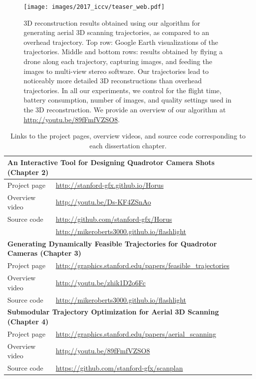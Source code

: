 \begin{figure}[t!]
\begin{center}
\texttt{[image: images/2017\_iccv/teaser\_web.pdf]}
\end{center}
\caption{
3D reconstruction results obtained using our algorithm for generating aerial 3D scanning trajectories, as compared to an overhead trajectory.
Top row: Google Earth visualizations of the trajectories.
Middle and bottom rows: results obtained by flying a drone along each trajectory, capturing images, and feeding the images to multi-view stereo software.
Our trajectories lead to noticeably more detailed 3D reconstructions than overhead trajectories.
In all our experiments, we control for the flight time, battery consumption, number of images, and quality settings used in the 3D reconstruction.
We provide an overview of our algorithm at \url{http://youtu.be/89fFmfVZSO8}.
}
\label{fig:teaser}
\end{figure}


\begin{table}[t]
\centering
\footnotesize
\begin{tabular}{@{}ll@{}}
\toprule
\multicolumn{2}{l}{ \textbf{An Interactive Tool for Designing Quadrotor Camera Shots (Chapter 2)} } \\
\midrule
Project page   & \url{http://stanford-gfx.github.io/Horus}         \\ 
Overview video & \url{http://youtu.be/Ds-KF4ZSnAo}                 \\  
Source code    & \url{http://github.com/stanford-gfx/Horus}        \\
               & \url{http://mikeroberts3000.github.io/flashlight} \\
\midrule
\multicolumn{2}{l}{ \textbf{Generating Dynamically Feasible Trajectories for Quadrotor Cameras (Chapter 3)} } \\
\midrule
Project page   & \url{http://graphics.stanford.edu/papers/feasible_trajectories} \\ 
Overview video & \url{http://youtu.be/zhik1D2o6Fc}                               \\  
Source code    & \url{http://mikeroberts3000.github.io/flashlight}               \\
\midrule
\multicolumn{2}{l}{ \textbf{Submodular Trajectory Optimization for Aerial 3D Scanning (Chapter 4)} } \\
\midrule
Project page   & \url{http://graphics.stanford.edu/papers/aerial_scanning} \\ 
Overview video & \url{http://youtu.be/89fFmfVZSO8}                         \\  
Source code    & \url{https://github.com/stanford-gfx/scanplan}            \\
\bottomrule
\end{tabular}
\normalsize
\caption{
Links to the project pages, overview videos, and source code corresponding to each dissertation chapter.
}
\label{tbl:grid}
\end{table}

